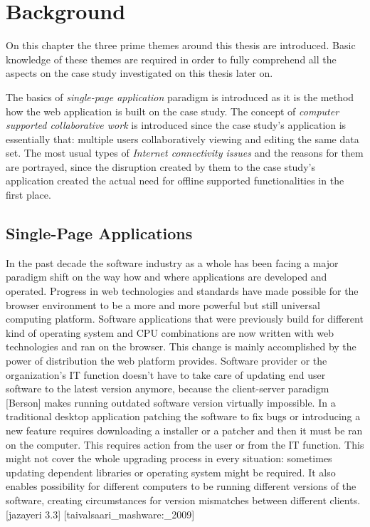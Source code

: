 \chapter{Background}

On this chapter the three prime themes around this thesis are introduced. Basic knowledge of these themes are required in order to fully comprehend all the aspects on the case study investigated on this thesis later on. 

The basics of \textit{single-page application} paradigm is introduced as it is the method how the web application is built on the case study. The concept of \textit{computer supported collaborative work} is introduced since the case study's application is essentially that: multiple users collaboratively viewing and editing the same data set. The most usual types of \textit{Internet connectivity issues} and the reasons for them are portrayed, since the disruption created by them to the case study's application created the actual need for offline supported functionalities in the first place. 




\section{Single-Page Applications}




In the past decade the software industry as a whole has been facing a major paradigm shift on the way how and where applications are developed and operated. Progress in web technologies and standards have made possible for the browser environment to be a more and more powerful but still universal computing platform. Software applications that were previously build for different kind of operating system and CPU combinations are now written with web technologies and ran on the browser. This change is mainly accomplished by the power of distribution the web platform provides. Software provider or the organization's IT function doesn't have to take care of updating end user software to the latest version anymore, because the client-server paradigm [Berson] makes running outdated software version virtually impossible. In a traditional desktop application patching the software to fix bugs or introducing a new feature requires downloading a installer or a patcher and then it must be ran on the computer. This requires action from the user or from the IT function. This might not cover the whole upgrading process in every situation: sometimes updating dependent libraries or operating system might be required. It also enables possibility for different computers to be running different versions of the software, creating circumstances for version mismatches between different clients. [jazayeri 3.3] [taivalsaari_mashware:_2009]

